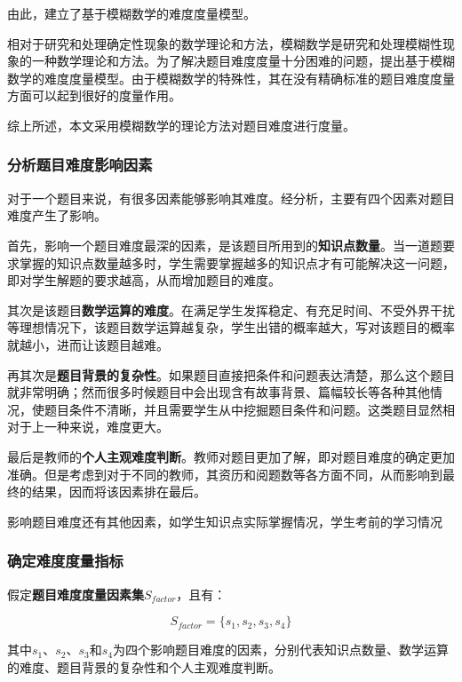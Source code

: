 由此，建立了基于模糊数学的难度度量模型。

相对于研究和处理确定性现象的数学理论和方法，模糊数学是研究和处理模糊性现象的一种数学理论和方法\cite{MoHuShuXue}。为了解决题目难度度量十分困难的问题，提出基于模糊数学的难度度量模型。由于模糊数学的特殊性，其在没有精确标准的题目难度度量方面可以起到很好的度量作用。

综上所述，本文采用模糊数学的理论方法对题目难度进行度量。

\subsubsection{分析题目难度影响因素}

对于一个题目来说，有很多因素能够影响其难度。经分析，主要有四个因素对题目难度产生了影响。

首先，影响一个题目难度最深的因素，是该题目所用到的\textbf{知识点数量}。当一道题要求掌握的知识点数量越多时，学生需要掌握越多的知识点才有可能解决这一问题，即对学生解题的要求越高，从而增加题目的难度。

其次是该题目\textbf{数学运算的难度}。在满足学生发挥稳定、有充足时间、不受外界干扰等理想情况下，该题目数学运算越复杂，学生出错的概率越大，写对该题目的概率就越小，进而让该题目越难。

再其次是\textbf{题目背景的复杂性}。如果题目直接把条件和问题表达清楚，那么这个题目就非常明确；然而很多时候题目中会出现含有故事背景、篇幅较长等各种其他情况，使题目条件不清晰，并且需要学生从中挖掘题目条件和问题。这类题目显然相对于上一种来说，难度更大。

最后是教师的\textbf{个人主观难度判断}。教师对题目更加了解，即对题目难度的确定更加准确。但是考虑到对于不同的教师，其资历和阅题数等各方面不同，从而影响到最终的结果，因而将该因素排在最后。

影响题目难度还有其他因素，如学生知识点实际掌握情况，学生考前的学习情况

\subsubsection{确定难度度量指标}

假定\textbf{题目难度度量因素集}$S_{factor}$，且有：

\begin{equation}
    S_{factor} = \{ s_1, s_2, s_3, s_4 \}
\end{equation}

其中$s_1$、$s_2$、$s_3$和$s_4$为四个影响题目难度的因素，分别代表知识点数量、数学运算的难度、题目背景的复杂性和个人主观难度判断。

